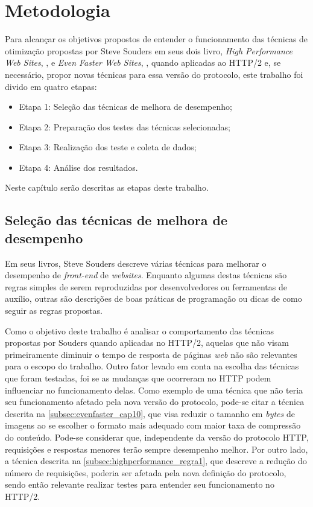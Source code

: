 %
%

\chapter{Metodologia}
\label{chap:metodologia}

Para alcançar os objetivos propostos de entender o funcionamento das técnicas de otimização propostas por Steve Souders em seus dois livro, \textit{High Performance Web Sites}, \cite{HighPerformance}, e \textit{Even Faster Web Sites}, \cite{EvenFaster}, quando aplicadas ao HTTP/2 e, se necessário, propor novas técnicas para essa versão do protocolo, este trabalho foi divido em quatro etapas:

\begin{itemize}
	\item Etapa 1: Seleção das técnicas de melhora de desempenho;
	\item Etapa 2: Preparação dos testes das técnicas selecionadas;
	\item Etapa 3: Realização dos teste e coleta de dados;
	\item Etapa 4: Análise dos resultados.
\end{itemize}

Neste capítulo serão descritas as etapas deste trabalho.

\section{Seleção das técnicas de melhora de desempenho}
\label{sec:selecaodastecnicasdemelhoradedesempenho}

Em seus livros, Steve Souders descreve várias técnicas para melhorar o desempenho de \textit{front-end} de \textit{websites}. Enquanto algumas destas técnicas são regras simples de serem reproduzidas por desenvolvedores ou ferramentas de auxílio, outras são descrições de boas práticas de programação ou dicas de como seguir as regras propostas.

Como o objetivo deste trabalho é analisar o comportamento das técnicas propostas por Souders quando aplicadas no HTTP/2, aquelas que não visam primeiramente diminuir o tempo de resposta de páginas \textit{web} não são relevantes para o escopo do trabalho. Outro fator levado em conta na escolha das técnicas que foram testadas, foi se as mudanças que ocorreram no HTTP podem influenciar no funcionamento delas. Como exemplo de uma técnica que não teria seu funcionamento afetado pela nova versão do protocolo, pode-se citar a técnica descrita na \autoref{subsec:evenfaster_cap10}, que visa reduzir o tamanho em \textit{bytes} de imagens ao se escolher o formato mais adequado com maior taxa de compressão do conteúdo. Pode-se considerar que, independente da versão do protocolo HTTP, requisições e respostas menores terão sempre desempenho melhor. Por outro lado, a técnica descrita na \autoref{subsec:highperformance_regra1}, que descreve a redução do número de requisições, poderia ser afetada pela nova definição do protocolo, sendo então relevante realizar testes para entender seu funcionamento no HTTP/2.

